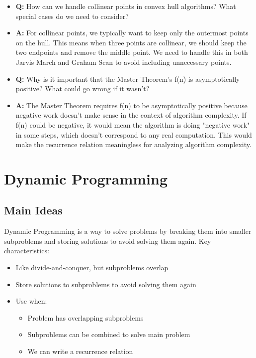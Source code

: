 \documentclass[11pt,a4paper]{article}
\begin{document}
\begin{multicols}{2}
\begin{itemize}
    \item \textbf{Q:} How can we handle collinear points in convex hull algorithms? What special cases do we need to consider?
    \item \textbf{A:} For collinear points, we typically want to keep only the outermost points on the hull. This means when three points are collinear, we should keep the two endpoints and remove the middle point. We need to handle this in both Jarvis March and Graham Scan to avoid including unnecessary points.

    \item \textbf{Q:} Why is it important that the Master Theorem's f(n) is asymptotically positive? What could go wrong if it wasn't?
    \item \textbf{A:} The Master Theorem requires f(n) to be asymptotically positive because negative work doesn't make sense in the context of algorithm complexity. If f(n) could be negative, it would mean the algorithm is doing "negative work" in some steps, which doesn't correspond to any real computation. This would make the recurrence relation meaningless for analyzing algorithm complexity.
\end{itemize}

\section{Dynamic Programming}
\subsection{Main Ideas}
Dynamic Programming is a way to solve problems by breaking them into smaller subproblems and storing solutions to avoid solving them again.
Key characteristics:
\begin{itemize}
    \item Like divide-and-conquer, but subproblems overlap
    \item Store solutions to subproblems to avoid solving them again
    \item Use when:
    \begin{itemize}
        \item Problem has overlapping subproblems
        \item Subproblems can be combined to solve main problem
        \item We can write a recurrence relation
    \end{itemize}
\end{itemize}


\end{multicols}
\end{document}
